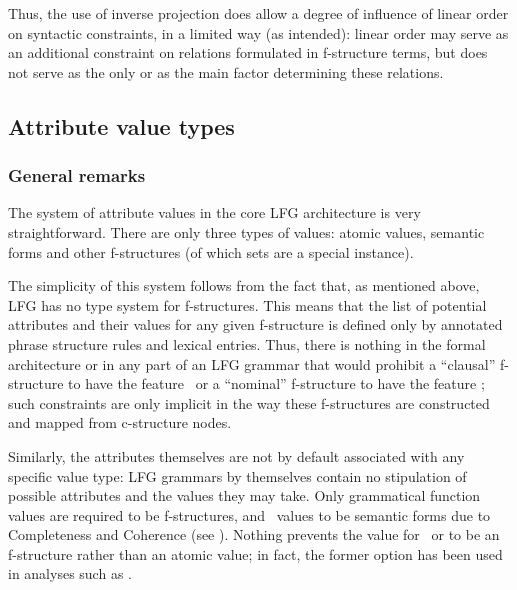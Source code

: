 \documentclass[output=paper,hidelinks]{langscibook}
\begin{document}
 Thus, the use of inverse projection does allow a degree of influence of linear order on syntactic constraints, in a limited way (as intended): linear order may serve as an additional constraint on relations formulated in f-structure terms, but does not serve as the only or as the main factor determining these relations.

 
 \subsection{Attribute value types\label{sect:valtypes}}
 
 \subsubsection{General remarks}
 
 The system of attribute values in the core LFG architecture is very straightforward. There are only three types of values: atomic values, semantic forms and other f-structures (of which sets are a special instance).
 
 The simplicity of this system follows from the fact that, as mentioned above, LFG has no type system for f-structures. This means that the list of potential attributes and their values for any given f-structure is defined only by annotated phrase structure rules and lexical entries. Thus, there is nothing in the formal architecture or in any part of an LFG grammar that would prohibit a ``clausal'' f-structure to have the feature \CASE\ or a ``nominal'' f-structure to have the feature \TENSE; such constraints are only implicit in the way these f-structures are constructed and mapped from c-structure nodes.
 
 Similarly, the attributes themselves are not by default associated with any specific value type: LFG grammars by themselves contain no stipulation of possible attributes and the values they may take. Only grammatical function values are required to be f-structures, and \PRED\ values to be semantic forms due to Completeness and Coherence (see ). Nothing prevents the value for \CASE\ or \PERS to be an f-structure rather than an atomic value; in fact, the former option has been used in analyses such as \textcite{DalrympleKaplan2000}.
 
\end{document}
